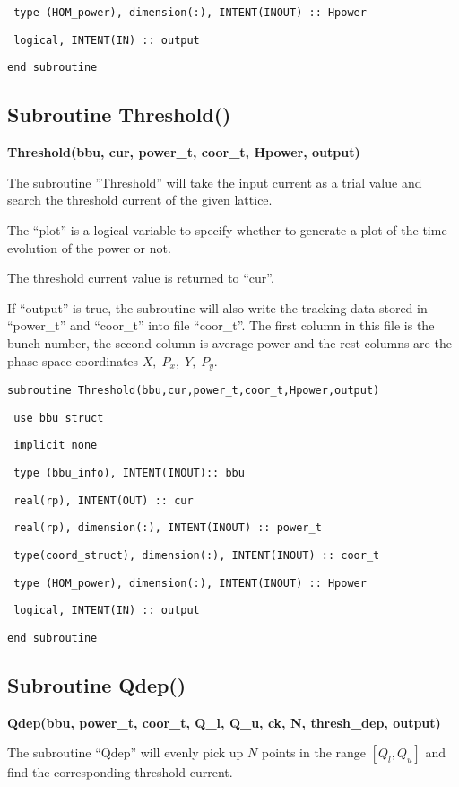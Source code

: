 \documentclass[12pt]{article}
\begin{document}
\texttt{    type (HOM\_power), dimension(:), INTENT(INOUT) :: Hpower}

\texttt{    logical, INTENT(IN) :: output}

\texttt{end subroutine}

\subsection{Subroutine Threshold()}
{\bf Threshold(bbu, cur, power\_t, coor\_t, Hpower, output)}

The subroutine ''Threshold'' will take the input current as a trial value and search the threshold current of the given lattice.

The ``plot'' is a logical variable to specify whether to generate a plot of the time evolution of the power or not.

The threshold current value is returned to ``cur''.

If ``output'' is true, the subroutine will also write the tracking data stored in ``power\_t'' and ``coor\_t'' into file ``coor\_t''. The first column in this file is the bunch number, the second column is average power and the rest columns are the phase space coordinates $X,\;P_x,\;Y,\;P_y$.

\texttt{subroutine Threshold(bbu,cur,power\_t,coor\_t,Hpower,output)}

\texttt{    use bbu\_struct}

\texttt{    implicit none}

\texttt{    type (bbu\_info), INTENT(INOUT):: bbu}

\texttt{   real(rp),        INTENT(OUT)  :: cur}

\texttt{    real(rp), dimension(:), INTENT(INOUT) :: power\_t}

\texttt{    type(coord\_struct), dimension(:), INTENT(INOUT) :: coor\_t}

\texttt{    type (HOM\_power), dimension(:), INTENT(INOUT) :: Hpower}

\texttt{    logical, INTENT(IN) :: output}

\texttt{end subroutine}

\subsection{Subroutine Qdep()}
{\bf Qdep(bbu, power\_t, coor\_t, Q\_l, Q\_u, ck, N, thresh\_dep, output)}

The subroutine ``Qdep'' will evenly pick up $N$ points in the range $[Q_l, Q_u]$ and find the corresponding threshold current.
\end{document}
